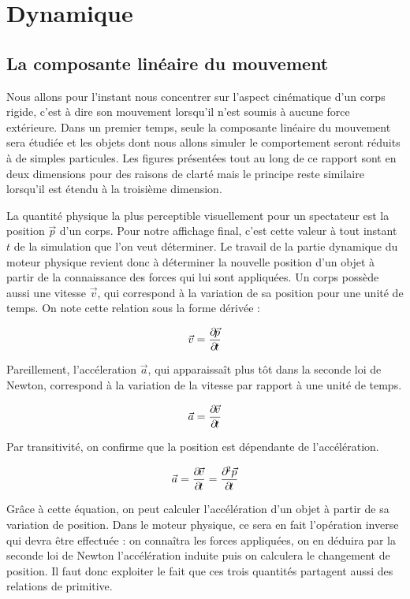 \section{Dynamique} 

\subsection{La composante linéaire du mouvement}

Nous allons pour l'instant nous concentrer sur l'aspect cinématique
d'un corps rigide, c'est à dire son mouvement lorsqu'il n'est soumis à
aucune force extérieure. Dans un premier temps, seule la composante
linéaire du mouvement sera étudiée et les objets dont nous allons
simuler le comportement seront réduits à de simples particules. Les
figures présentées tout au long de ce rapport sont en deux dimensions
pour des raisons de clarté mais le principe reste similaire lorsqu'il
est étendu à la troisième dimension.

La quantité physique la plus perceptible visuellement pour un
spectateur est la position $\vec p$ d'un corps. Pour notre affichage
final, c'est cette valeur à tout instant $t$ de la simulation que l'on
veut déterminer. Le travail de la partie dynamique du moteur physique
revient donc à déterminer la nouvelle position d'un objet à partir de
la connaissance des forces qui lui sont appliquées. Un corps possède
aussi une vitesse $\vec v$, qui correspond à la variation de sa
position pour une unité de temps. On note cette relation sous la forme
dérivée :

\begin{align*}
  \vec{v} = \frac{\partial \! \vec{p}}{\partial \! t}
\end{align*}

Pareillement, l'accéleration $\vec a$, qui apparaissaît plus tôt dans
la seconde loi de Newton, correspond à la variation de la vitesse par
rapport à une unité de temps.

\begin{align*}
  \vec{a} = \frac{\partial \! \vec{v}}{\partial \! t}
\end{align*}

Par transitivité, on confirme que la position est dépendante de
l'accélération.

\begin{align*}
  \vec{a} = \frac{\partial \! \vec{v}}{\partial \! t} = \frac{\partial \!^2
    \vec{p}}{\partial \! t}
\end{align*}

Grâce à cette équation, on peut calculer l'accélération d'un objet à
partir de sa variation de position. Dans le moteur physique, ce sera
en fait l'opération inverse qui devra être effectuée : on connaîtra
les forces appliquées, on en déduira par la seconde loi de Newton
l'accélération induite puis on calculera le changement de position. Il
faut donc exploiter le fait que ces trois quantités partagent aussi
des relations de primitive.

